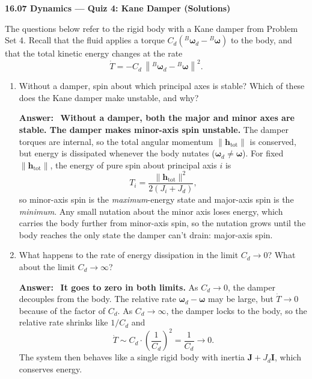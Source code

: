 \documentclass[11pt,letterpaper]{article}
\newenvironment{answer}{\par\vspace{4pt}\color{blue!60!black}\textbf{Answer:}\ }{\par\vspace{4pt}}
\begin{document}
\begin{center}
    {\Large \textbf{16.07 Dynamics --- Quiz 4: Kane Damper (Solutions)}}\\[4pt]
\end{center}

\vspace{4pt}
The questions below refer to the rigid body with a Kane damper from Problem Set 4. Recall that the fluid applies a torque $C_d\left({}^{B}\boldsymbol{\omega}_d - {}^{B}\boldsymbol{\omega}\right)$ to the body, and that the total kinetic energy changes at the rate
\[
\dot T = -C_d\,\left\lVert {}^{B}\boldsymbol{\omega}_d - {}^{B}\boldsymbol{\omega} \right\rVert^2 .
\]

\vspace{10pt}
\begin{enumerate}[label=\textbf{\arabic*.}, leftmargin=*, itemsep=4pt]

\item Without a damper, spin about which principal axes is stable? Which of these does the Kane damper make unstable, and why?

\begin{answer}
\textbf{Without a damper, both the major and minor axes are stable. The damper makes minor-axis spin unstable.} The damper torques are internal, so the total angular momentum $\lVert\mathbf{h}_{\text{tot}}\rVert$ is conserved, but energy is dissipated whenever the body nutates ($\boldsymbol{\omega}_d \neq \boldsymbol{\omega}$). For fixed $\lVert\mathbf{h}_{\text{tot}}\rVert$, the energy of pure spin about principal axis $i$ is
\[
T_i = \frac{\lVert\mathbf{h}_{\text{tot}}\rVert^2}{2\left(J_i + J_d\right)},
\]
so minor-axis spin is the \emph{maximum}-energy state and major-axis spin is the \emph{minimum}. Any small nutation about the minor axis loses energy, which carries the body further from minor-axis spin, so the nutation grows until the body reaches the only state the damper can't drain: major-axis spin.
\end{answer}

\item What happens to the rate of energy dissipation in the limit $C_d \to 0$? What about the limit $C_d \to \infty$?

\begin{answer}
\textbf{It goes to zero in both limits.} As $C_d \to 0$, the damper decouples from the body. The relative rate $\boldsymbol{\omega}_d - \boldsymbol{\omega}$ may be large, but $\dot T \to 0$ because of the factor of $C_d$. As $C_d \to \infty$, the damper locks to the body, so the relative rate shrinks like $1/C_d$ and
\[
\dot T \sim C_d \cdot \left(\frac{1}{C_d}\right)^2 = \frac{1}{C_d} \to 0 .
\]
The system then behaves like a single rigid body with inertia $\mathbf{J} + J_d\mathbf{I}$, which conserves energy.
\end{answer}


\end{enumerate}
\end{document}

